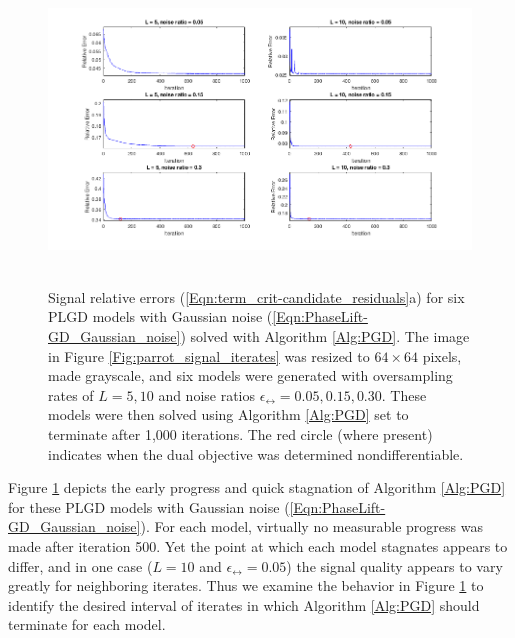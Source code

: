 \newpage

\begin{figure}[H]
\centering
\hbox{\hspace{-1.2cm} \includegraphics[scale=0.6]{term_crit-signal_err} }\vspace{-0.4cm}
\caption{Signal relative errors (\ref{Eqn:term_crit-candidate_residuals}a) for six PLGD models with Gaussian noise (\ref{Eqn:PhaseLift-GD_Gaussian_noise})  solved with Algorithm \ref{Alg:PGD}. The image in Figure \ref{Fig:parrot_signal_iterates} was resized to $64 \times 64$ pixels, made grayscale, and six models were generated with oversampling rates of $L = 5, 10$ and noise ratios $\epsilon_\rel = 0.05, 0.15, 0.30$.  These models were then solved using Algorithm \ref{Alg:PGD} set to terminate after 1,000 iterations.  The red circle (where present) indicates when the dual objective was determined nondifferentiable.}
\label{Fig:term_crit-signal_err}
\end{figure}

Figure \ref{Fig:term_crit-signal_err} depicts the early progress and quick stagnation of Algorithm \ref{Alg:PGD} for these PLGD models with Gaussian noise (\ref{Eqn:PhaseLift-GD_Gaussian_noise}).  For each model, virtually no measurable progress was made after iteration 500.  Yet the point at which each model stagnates appears to differ, and in one case ($L = 10$ and $\epsilon_\rel = 0.05$) the signal quality appears to vary greatly for neighboring iterates.  Thus we examine the behavior in Figure \ref{Fig:term_crit-signal_err} to identify the desired interval of iterates in which Algorithm \ref{Alg:PGD} should terminate for each model.




